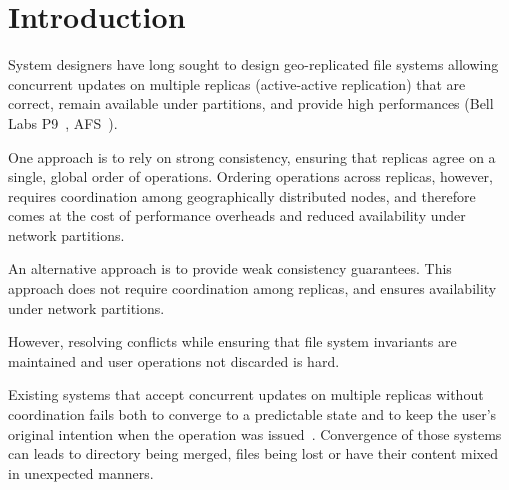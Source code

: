 \documentclass[sigconf,anonymous,10pt]{acmart}
\begin{document}


\maketitle

\sloppy

\section{Introduction}


System designers have long sought to design geo-replicated file systems
allowing concurrent updates on multiple replicas (active-active replication)
that are correct, remain available under partitions,
and provide high performances (Bell Labs P9~\cite{pike1995plan}, AFS~\cite{howard1988scale}).

One approach is to rely on strong consistency, ensuring that replicas agree on a single, global order of operations. Ordering operations across replicas, however, requires coordination among geographically distributed nodes, and therefore comes at the cost of performance overheads and reduced availability under network partitions.

An alternative approach is to provide weak consistency guarantees.
This approach does not require coordination among replicas, and ensures availability under network partitions.

However, resolving conflicts while ensuring that file system invariants are maintained and user operations not discarded is hard.

Existing systems that accept concurrent updates on multiple replicas without coordination fails both to converge to a predictable state and
to keep the user's original intention when the operation was issued~\cite{cai2018some}.
Convergence of those systems can leads to directory being merged,
files being lost or have their content mixed in unexpected manners.
\end{document}
